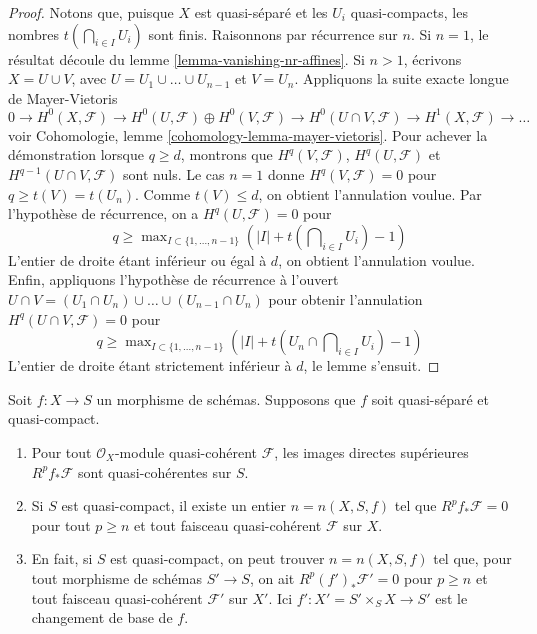 \begin{proof}
Notons que, puisque $X$ est quasi-séparé et les $U_i$ quasi-compacts, les nombres
$t(\bigcap_{i \in I} U_i)$ sont finis. Raisonnons par récurrence sur $n$.
Si $n = 1$, le résultat découle du lemme \ref{lemma-vanishing-nr-affines}.
Si $n > 1$, écrivons $X = U \cup V$, avec $U = U_1 \cup \ldots \cup U_{n - 1}$
et $V = U_n$. Appliquons la suite exacte longue de Mayer-Vietoris
$$
0 \to
H^0(X, \mathcal{F}) \to
H^0(U, \mathcal{F}) \oplus H^0(V, \mathcal{F}) \to
H^0(U \cap V, \mathcal{F}) \to
H^1(X, \mathcal{F}) \to \ldots
$$
voir Cohomologie, lemme \ref{cohomology-lemma-mayer-vietoris}.
Pour achever la démonstration lorsque $q \geq d$, montrons que
$H^q(V, \mathcal{F})$, $H^q(U, \mathcal{F})$ et
$H^{q - 1}(U \cap V, \mathcal{F})$ sont
nuls. Le cas $n = 1$ donne $H^q(V, \mathcal{F}) = 0$ pour
$q \geq t(V) = t(U_n)$. Comme $t(V) \leq d$, on obtient l'annulation voulue. Par
l'hypothèse de récurrence, on a $H^q(U, \mathcal{F}) = 0$ pour
$$
q \geq \max\nolimits_{I \subset \{1, \ldots, n - 1\}}
\left(|I| + t(\bigcap\nolimits_{i \in I} U_i) - 1\right)
$$
L'entier de droite étant inférieur ou égal à $d$, on
obtient l'annulation voulue. Enfin, appliquons l'hypothèse de récurrence à l'ouvert
$U \cap V = (U_1 \cap U_n) \cup \ldots \cup (U_{n - 1} \cap U_n)$ pour
obtenir l'annulation $H^q(U \cap V, \mathcal{F}) = 0$ pour
$$
q \geq \max\nolimits_{I \subset \{1, \ldots, n - 1\}}
\left(|I| + t(U_n \cap \bigcap\nolimits_{i \in I} U_i) - 1\right)
$$
L'entier de droite étant strictement inférieur à $d$,
le lemme s'ensuit.
\end{proof}

\begin{lemma}
\label{lemma-quasi-coherence-higher-direct-images}
Soit $f : X \to S$ un morphisme de schémas.
Supposons que $f$ soit quasi-séparé et quasi-compact.
\begin{enumerate}
\item Pour tout $\mathcal{O}_X$-module quasi-cohérent $\mathcal{F}$,
les images directes supérieures $R^pf_*\mathcal{F}$ sont quasi-cohérentes sur $S$.
\item Si $S$ est quasi-compact, il existe un entier $n = n(X, S, f)$
tel que $R^pf_*\mathcal{F} = 0$ pour tout $p \geq n$ et tout
faisceau quasi-cohérent $\mathcal{F}$ sur $X$.
\item En fait, si $S$ est quasi-compact, on peut trouver $n = n(X, S, f)$
tel que, pour tout
morphisme de schémas $S' \to S$, on ait $R^p(f')_*\mathcal{F}' = 0$
pour $p \geq n$ et tout faisceau quasi-cohérent $\mathcal{F}'$
sur $X'$. Ici $f' : X' = S' \times_S X \to S'$ est le changement de base de $f$.
\end{enumerate}
\end{lemma}

